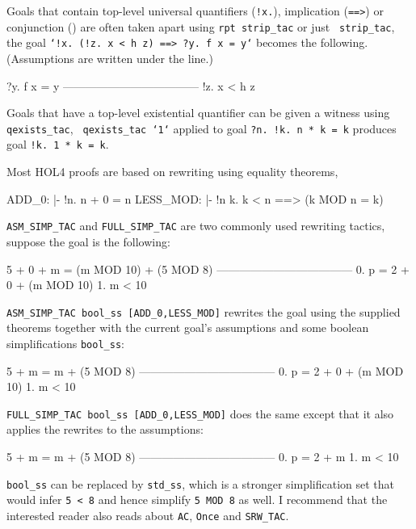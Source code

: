 \documentclass[a4paper,10pt]{article}
\begin{document}

Goals that contain top-level universal quantifiers ({\tt !x.}),
implication ({\tt ==>}) or conjunction ({\tt \conj{}}) are often
taken apart using {\tt\small rpt strip\_tac} or just {\tt\small
  strip\_tac}, \eg{} the goal {\tt\small `!x{.}~(!z{.}~x < h z) ==> ?y{.}~f x = y`}
becomes the following. (Assumptions are written under the line.)
\begin{code}
    ?y. f x = y
    ------------------------------------
      !z. x < h z
\end{code}


Goals that have a top-level existential quantifier can be given a
witness using {\tt \small qexists\_tac}, \eg{} {\tt \small
  qexists\_tac `1`} applied to goal {\tt \small ?n{.}~!k{.}~n * k = k}
produces goal {\tt \small !k{.}~1 * k = k}.


Most HOL4 proofs are based on rewriting using equality theorems, \eg{}
\begin{code}
ADD_0:            |- !n. n + 0 = n
LESS_MOD:         |- !n k. k < n ==> (k MOD n = k)
\end{code} {\tt \small ASM\_SIMP\_TAC} and {\tt \small FULL\_SIMP\_TAC} are two
commonly used rewriting tactics, \eg{} suppose the goal is the following:
\begin{code}
    5 + 0 + m = (m MOD 10) + (5 MOD 8)
    ------------------------------------
      0.  p = 2 + 0 + (m MOD 10)
      1.  m < 10
\end{code}
{\tt \small ASM\_SIMP\_TAC bool\_ss
  [ADD\_0,LESS\_MOD]} rewrites the
goal using the supplied theorems together with the current goal's
assumptions and some boolean simplifications {\tt \small bool\_ss}:
\begin{code}
    5 + m = m + (5 MOD 8)
    ------------------------------------
      0.  p = 2 + 0 + (m MOD 10)
      1.  m < 10
\end{code}
{\tt \small FULL\_SIMP\_TAC bool\_ss [ADD\_0,LESS\_MOD]}
does the same except that it also applies the rewrites to the
assumptions:
\begin{code}
    5 + m = m + (5 MOD 8)
    ------------------------------------
      0.  p = 2 + m
      1.  m < 10
\end{code}

{\tt \small bool\_ss} can be replaced by {\tt \small std\_ss}, which
is a stronger simplification set that would infer {\tt \small 5 < 8}
and hence simplify {\tt\small 5 MOD 8} as well. I recommend that the
interested reader also reads about {\tt\small AC}, {\tt\small Once}
and {\tt\small SRW\_TAC}.
\end{document}
